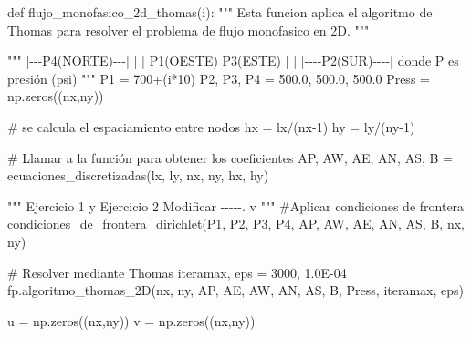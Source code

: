 \documentclass[
  letterpaper,
  DIV=11,
  numbers=noendperiod]{scrreprt}
\newenvironment{Shaded}{\begin{snugshade}}{\end{snugshade}}
\newcommand{\CommentTok}[1]{\textcolor[rgb]{0.37,0.37,0.37}{#1}}
\newcommand{\DecValTok}[1]{\textcolor[rgb]{0.68,0.00,0.00}{#1}}
\newcommand{\FloatTok}[1]{\textcolor[rgb]{0.68,0.00,0.00}{#1}}
\newcommand{\KeywordTok}[1]{\textcolor[rgb]{0.00,0.23,0.31}{#1}}
\newcommand{\NormalTok}[1]{\textcolor[rgb]{0.00,0.23,0.31}{#1}}
\newcommand{\OperatorTok}[1]{\textcolor[rgb]{0.37,0.37,0.37}{#1}}
\begin{document}
\begin{Shaded}
\begin{Highlighting}[]
\KeywordTok{def}\NormalTok{ flujo\_monofasico\_2d\_thomas(i):}
    \CommentTok{"""}
\CommentTok{    Esta funcion aplica el algoritmo de Thomas para resolver el problema de flujo monofasico en 2D.}
\CommentTok{    """}
    
    \CommentTok{"""}
\CommentTok{        |{-}{-}{-}P4(NORTE){-}{-}{-}|}
\CommentTok{        |               |}
\CommentTok{    P1(OESTE)        P3(ESTE)}
\CommentTok{        |               |}
\CommentTok{        |{-}{-}{-}{-}P2(SUR){-}{-}{-}{-}|}
\CommentTok{    }
\CommentTok{    donde P es presión (psi)}
\CommentTok{    """}
\NormalTok{    P1 }\OperatorTok{=} \DecValTok{700}\OperatorTok{+}\NormalTok{(i}\OperatorTok{*}\DecValTok{10}\NormalTok{)}
\NormalTok{    P2, P3, P4  }\OperatorTok{=} \FloatTok{500.0}\NormalTok{, }\FloatTok{500.0}\NormalTok{, }\FloatTok{500.0}
\NormalTok{    Press }\OperatorTok{=}\NormalTok{ np.zeros((nx,ny))}

    \CommentTok{\# se calcula el espaciamiento entre nodos}
\NormalTok{    hx }\OperatorTok{=}\NormalTok{ lx}\OperatorTok{/}\NormalTok{(nx}\OperatorTok{{-}}\DecValTok{1}\NormalTok{)}
\NormalTok{    hy }\OperatorTok{=}\NormalTok{ ly}\OperatorTok{/}\NormalTok{(ny}\OperatorTok{{-}}\DecValTok{1}\NormalTok{)}
    
    \CommentTok{\# Llamar a la función para obtener los coeficientes}
\NormalTok{    AP, AW, AE, AN, AS, B }\OperatorTok{=}\NormalTok{ ecuaciones\_discretizadas(lx, ly, nx, ny, hx, hy)}
    
    \CommentTok{"""}
\CommentTok{    Ejercicio 1 y Ejercicio 2}
\CommentTok{    }
\CommentTok{    Modificar {-}{-}{-}{-}{-}.}
\CommentTok{                   v}
\CommentTok{    """}
    \CommentTok{\#Aplicar condiciones de frontera}
\NormalTok{    condiciones\_de\_frontera\_dirichlet(P1, P2, P3, P4, AP, AW, AE, AN, AS, B, nx, ny)}
    
    \CommentTok{\# Resolver mediante Thomas}
\NormalTok{    iteramax, eps }\OperatorTok{=} \DecValTok{3000}\NormalTok{, }\FloatTok{1.0E{-}04}
\NormalTok{    fp.algoritmo\_thomas\_2D(nx, ny, AP, AE, AW, AN, AS, B, Press, iteramax, eps)}
    
\NormalTok{    u }\OperatorTok{=}\NormalTok{ np.zeros((nx,ny)) }
\NormalTok{    v }\OperatorTok{=}\NormalTok{ np.zeros((nx,ny)) }
    

\end{Highlighting}
\end{Shaded}
\end{document}
